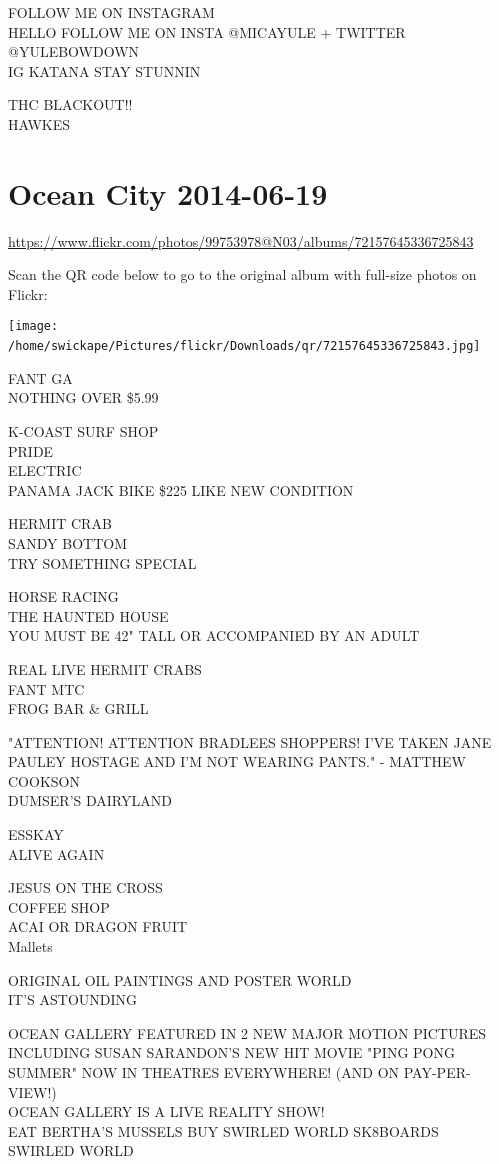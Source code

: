 \documentclass[10pt,letterpaper]{article}
\begin{document}
FOLLOW ME ON INSTAGRAM\\
HELLO FOLLOW ME ON INSTA @MICAYULE + TWITTER @YULEBOWDOWN\\
IG KATANA STAY STUNNIN

THC BLACKOUT!!\\
HAWKES
\

\section*{Ocean City 2014-06-19}

\url{https://www.flickr.com/photos/99753978@N03/albums/72157645336725843}

Scan the QR code below to go to the original album with full-size photos on Flickr:

\texttt{[image: /home/swickape/Pictures/flickr/Downloads/qr/72157645336725843.jpg]}
\

FANT GA\\
NOTHING OVER \$5.99

K{-}COAST SURF SHOP\\
PRIDE\\
ELECTRIC\\
PANAMA JACK BIKE \$225 LIKE NEW CONDITION

HERMIT CRAB\\
SANDY BOTTOM\\
TRY SOMETHING SPECIAL

HORSE RACING\\
THE HAUNTED HOUSE\\
YOU MUST BE 42" TALL OR ACCOMPANIED BY AN ADULT

REAL LIVE HERMIT CRABS\\
FANT MTC\\
FROG BAR \& GRILL

"ATTENTION!  ATTENTION BRADLEES SHOPPERS!  I'VE TAKEN JANE PAULEY HOSTAGE AND I'M NOT WEARING PANTS." {-} MATTHEW COOKSON\\
DUMSER'S DAIRYLAND

ESSKAY\\
ALIVE AGAIN

JESUS ON THE CROSS\\
COFFEE SHOP\\
ACAI OR DRAGON FRUIT\\
Mallets

ORIGINAL OIL PAINTINGS AND POSTER WORLD\\
IT'S ASTOUNDING

OCEAN GALLERY FEATURED IN 2 NEW MAJOR MOTION PICTURES INCLUDING SUSAN SARANDON'S NEW HIT MOVIE "PING PONG SUMMER" NOW IN THEATRES EVERYWHERE!  (AND ON PAY{-}PER{-}VIEW!)\\
OCEAN GALLERY IS A LIVE REALITY SHOW!\\
EAT BERTHA'S MUSSELS BUY SWIRLED WORLD SK8BOARDS\\
SWIRLED WORLD
\end{document}
